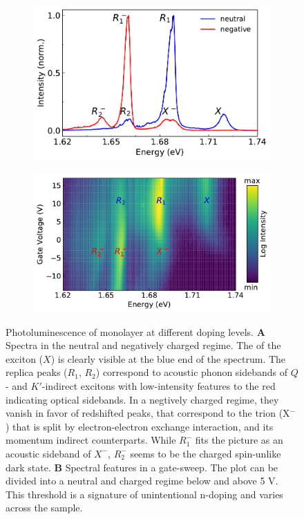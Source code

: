 \begin{figure}[t]
	\begin{subfigure}{0.49\textwidth}
		\caption{}
		\includegraphics[height=0.65\textwidth]{spectrum_neutral_negative}
	\end{subfigure}
	\begin{subfigure}{0.49\textwidth}
		\caption{}
		\includegraphics[height=0.65\textwidth]{Voltsweep}
	\end{subfigure}
	\caption{Photoluminescence of monolayer \wse at different doping levels. \textbf{A} Spectra in the neutral and negatively charged regime. The \pl of the exciton ($X$) is clearly visible at the blue end of the spectrum. The replica peaks ($R_1$, $R_2$) correspond to acoustic phonon sidebands of $Q$- and $K'$-indirect excitons with low-intensity features to the red indicating optical sidebands. In a negtively charged regime, they vanish in favor of redshifted peaks, that correspond to the trion (X$^-$) that is split by electron-electron exchange interaction, and its momentum indirect counterparts. While $R^-_1$ fits the picture as an acoustic sideband of $X^-$, $R^-_2$ seems to be the charged spin-unlike dark state. \textbf{B} Spectral features in a gate-sweep. The plot can be divided into a neutral and charged regime below and above 5 V. This threshold is a signature of unintentional n-doping and varies across the sample.}\label{plspectrum}
\end{figure} 

